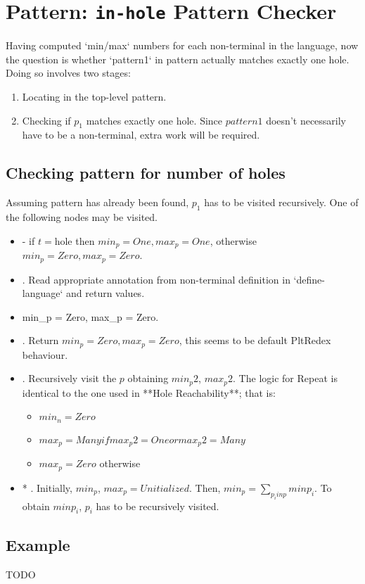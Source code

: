 \section{Pattern: \lstinline{in-hole} Pattern Checker}

Having computed `min/max` numbers for each non-terminal in the language, now the question is whether `pattern1` in pattern \InHolePattern actually matches exactly one hole. Doing so involves two stages:

\begin{enumerate}
\item
Locating \InHolePattern in the top-level pattern.
\item
Checking if $p_1$ matches exactly one hole. Since $pattern1$ doesn't necessarily have to be a non-terminal, extra work will be required.
\end{enumerate}

\subsection{Checking pattern for number of holes}

Assuming \InHolePattern pattern has already been found, $p_1$ has to be visited recursively. One of the following nodes may be visited.

\begin{itemize}
\item
\BuiltInPattern - if $t=$hole then $min_p = One, max_p = One$, otherwise $min_p = Zero, max_p=Zero$.

\item
\Nt. Read appropriate annotation from non-terminal definition in `define-language` and return values.

\item

\LiteralPattern min\_p = Zero, max\_p = Zero.

\item
\InHolePattern. Return $min_p = Zero, max_p = Zero$, this seems to be default PltRedex behaviour.

\item
\Repeat. Recursively visit the $p$ obtaining $min_p2$, $max_p2$. The logic for Repeat is identical to the one used in **Hole Reachability**; that is:
	\begin{itemize}
	\item
	$min_n = Zero$
	\item
	$max_p = Many if max_p2 = One or max_p2 = Many$
	\item
	$max_p = Zero$ otherwise
	\end{itemize}

\item
* \PatternSequence. Initially, $min_p$, $max_p = Unitialized$. Then, $min_p = \sum_{p_i in p} minp_i$. To obtain $minp_i$, $p_i$ has to be recursively visited.
\end{itemize}

\subsection{Example}
TODO
